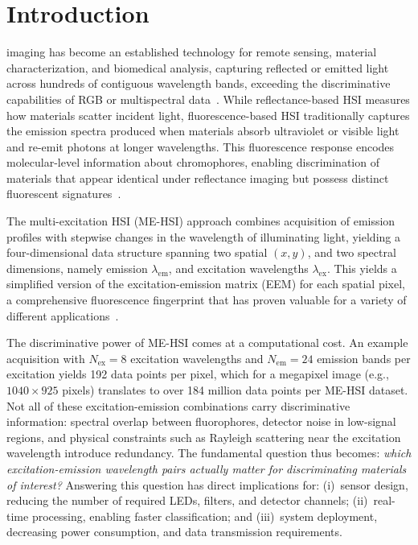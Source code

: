 \section{Introduction}
\label{sec:introduction}

 imaging has become an established technology for remote sensing, material characterization, and biomedical analysis, capturing reflected or emitted light across hundreds of contiguous wavelength bands, exceeding the discriminative capabilities of RGB or multispectral data~\cite{plaza2009recent,bioucas2013hyperspectral}.
While reflectance-based HSI measures how materials scatter
incident light, fluorescence-based HSI traditionally captures the emission spectra produced when materials absorb ultraviolet or visible light and re-emit photons at longer wavelengths.
This fluorescence response encodes molecular-level information about chromophores, enabling discrimination of materials that appear identical under reflectance imaging but possess distinct fluorescent signatures~\cite{muselimyan2016,gil2017}.

The multi-excitation HSI (ME-HSI) approach combines
acquisition of emission profiles with stepwise changes in the
wavelength of illuminating light, yielding a four-dimensional data structure spanning two spatial $(x, y)$, and two spectral dimensions, namely emission $\lambda_{\text{em}}$, and excitation wavelengths $\lambda_{\text{ex}}$.
This yields a simplified version of the excitation-emission matrix (EEM) for each spatial pixel, a comprehensive fluorescence fingerprint that has proven valuable for a variety of different applications~\cite{lakowicz2006principles,swift2018}.

The discriminative power of ME-HSI comes at a computational cost.
An example acquisition with $N_{\text{ex}} = 8$ excitation wavelengths and $N_{\text{em}} = 24$ emission bands per excitation yields 192 data points per pixel, which for a megapixel image (e.g., $1040 \times 925$ pixels) translates to over 184 million data points per ME-HSI dataset.
Not all of these excitation-emission combinations carry discriminative information: spectral overlap between fluorophores, detector noise in low-signal regions, and physical constraints such as Rayleigh scattering near the excitation wavelength introduce redundancy.
The fundamental question thus becomes: \emph{which excitation-emission wavelength pairs actually matter for discriminating materials of interest?}
Answering this question has direct implications for:
(i)~sensor design, reducing the number of required LEDs, filters, and detector channels;
(ii)~real-time processing, enabling faster classification; and
(iii)~system deployment, decreasing power consumption, and data transmission requirements.

